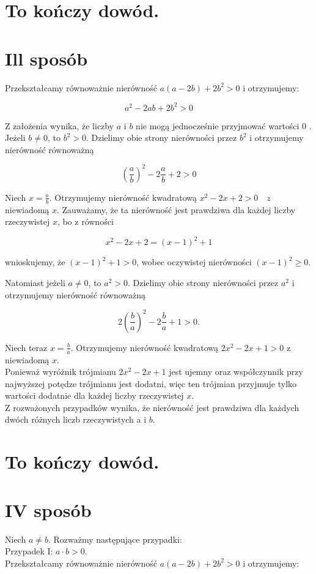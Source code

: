 \documentclass[10pt]{article}
\begin{document}
\section*{To kończy dowód.}
\section*{Ill sposób}
Przekształcamy równoważnie nierówność $a(a-2 b)+2 b^{2}>0$ i otrzymujemy:

$$
a^{2}-2 a b+2 b^{2}>0
$$

Z założenia wynika, że liczby $a$ i $b$ nie mogą jednocześnie przyjmować wartości 0 .\\
Jeżeli $b \neq 0$, to $b^{2}>0$. Dzielimy obie strony nierówności przez $b^{2}$ i otrzymujemy nierówność równoważną

$$
\left(\frac{a}{b}\right)^{2}-2 \frac{a}{b}+2>0
$$

Niech $x=\frac{a}{b}$. Otrzymujemy nierówność kwadratową $x^{2}-2 x+2>0 \quad z$ niewiadomą $x$. Zauważamy, że ta nierówność jest prawdziwa dla każdej liczby rzeczywistej $x$, bo z równości

$$
x^{2}-2 x+2=(x-1)^{2}+1
$$

wnioskujemy, że $(x-1)^{2}+1>0$, wobec oczywistej nierówności $(x-1)^{2} \geq 0$.

Natomiast jeżeli $a \neq 0$, to $a^{2}>0$. Dzielimy obie strony nierówności przez $a^{2}$ i otrzymujemy nierówność równoważną

$$
2\left(\frac{b}{a}\right)^{2}-2 \frac{b}{a}+1>0 .
$$

Niech teraz $x=\frac{b}{a}$. Otrzymujemy nierówność kwadratową $2 x^{2}-2 x+1>0$ z niewiadomą $x$.\\
Ponieważ wyróżnik trójmianu $2 x^{2}-2 x+1$ jest ujemny oraz współczynnik przy najwyższej potędze trójmianu jest dodatni, więc ten trójmian przyjmuje tylko wartości dodatnie dla każdej liczby rzeczywistej $x$.\\
Z rozważonych przypadków wynika, że nierówność jest prawdziwa dla każdych dwóch różnych liczb rzeczywistych a i $b$.

\section*{To kończy dowód.}
\section*{IV sposób}
Niech $a \neq b$. Rozważmy następujące przypadki:\\
Przypadek I: $a \cdot b>0$.\\
Przekształcamy równoważnie nierówność $a(a-2 b)+2 b^{2}>0$ i otrzymujemy:
\end{document}
